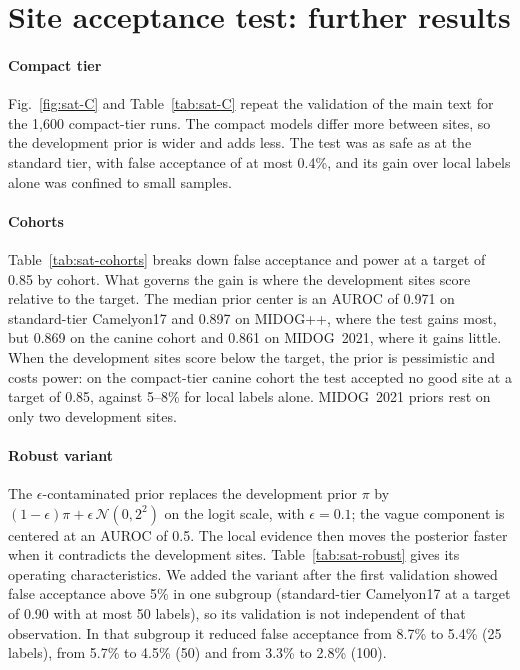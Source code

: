 \section{Site acceptance test: further results}
\label{sup:sat}

\paragraph{Compact tier} Fig.~\ref{fig:sat-C} and Table~\ref{tab:sat-C} repeat
the validation of the main text for the 1,600 compact-tier runs. The compact
models differ more between sites, so the development prior is wider and adds
less. The test was as safe as at the standard tier, with false acceptance of at
most 0.4\%, and its gain over local labels alone was confined to small samples.

\paragraph{Cohorts} Table~\ref{tab:sat-cohorts} breaks down false acceptance and
power at a target of 0.85 by cohort. What governs the gain is where the
development sites score relative to the target. The median prior center is an
AUROC of 0.971 on standard-tier Camelyon17 and 0.897 on MIDOG++, where the test
gains most, but 0.869 on the canine cohort and 0.861 on MIDOG~2021, where it
gains little. When the development sites score below the target, the prior is
pessimistic and costs power: on the compact-tier canine cohort the test
accepted no good site at a target of 0.85, against 5--8\% for local labels
alone. MIDOG~2021 priors rest on only two development sites.

\paragraph{Robust variant} The $\epsilon$-contaminated prior replaces the
development prior $\pi$ by $(1-\epsilon)\pi+\epsilon\,\mathcal N(0,2^2)$ on the
logit scale, with $\epsilon=0.1$; the vague component is centered at an AUROC of
0.5. The local evidence then moves the posterior faster when it contradicts the
development sites. Table~\ref{tab:sat-robust} gives its operating
characteristics. We added the variant after the first validation showed false
acceptance above 5\% in one subgroup (standard-tier Camelyon17 at a target of
0.90 with at most 50 labels), so its validation is not independent of that
observation. In that subgroup it reduced false acceptance from 8.7\% to 5.4\%
(25 labels), from 5.7\% to 4.5\% (50) and from 3.3\% to 2.8\% (100).


